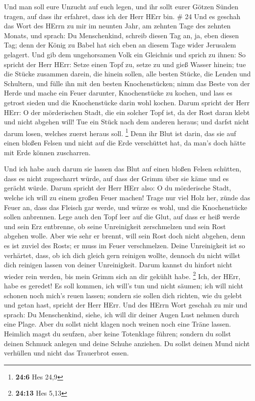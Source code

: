  Und man soll eure Unzucht auf euch legen, und ihr sollt
eurer Götzen Sünden tragen, auf dass ihr erfahret, dass ich der Herr
HErr bin. \# 24  Und es geschah das Wort des HErrn zu mir im
neunten Jahr, am zehnten Tage des zehnten Monats, und sprach:
 Du Menschenkind, schreib diesen Tag an, ja, eben diesen
Tag; denn der König zu Babel hat sich eben an diesem Tage wider
Jerusalem gelagert.  Und gib dem ungehorsamen Volk ein
Gleichnis und sprich zu ihnen: So spricht der Herr HErr: Setze einen
Topf zu, setze zu und gieß Wasser hinein;  tue die Stücke
zusammen darein, die hinein sollen, alle besten Stücke, die Lenden und
Schultern, und fülle ihn mit den besten Knochenstücken; 
nimm das Beste von der Herde und mache ein Feuer darunter, Knochenstücke
zu kochen, und lass es getrost sieden und die Knochenstücke darin wohl
kochen.  Darum spricht der Herr HErr: O der mörderischen
Stadt, die ein solcher Topf ist, da der Rost daran klebt und nicht
abgehen will! Tue ein Stück nach dem anderen heraus; und darfst nicht
darum losen, welches zuerst heraus soll. \footnote{\textbf{24:6} Hes
  24,9}  Denn ihr Blut ist darin, das sie auf einen bloßen
Felsen und nicht auf die Erde verschüttet hat, da man's doch hätte mit
Erde können zuscharren.

 Und ich habe auch darum sie lassen das Blut auf einen
bloßen Felsen schütten, dass es nicht zugescharrt würde, auf dass der
Grimm über sie käme und es gerächt würde.  Darum spricht der
Herr HErr also: O du mörderische Stadt, welche ich will zu einem großen
Feuer machen!  Trage nur viel Holz her, zünde das Feuer an,
dass das Fleisch gar werde, und würze es wohl, und die Knochenstücke
sollen anbrennen.  Lege auch den Topf leer auf die Glut,
auf dass er heiß werde und sein Erz entbrenne, ob seine Unreinigkeit
zerschmelzen und sein Rost abgehen wolle.  Aber wie sehr er
brennt, will sein Rost doch nicht abgehen, denn es ist zuviel des Rosts;
er muss im Feuer verschmelzen.  Deine Unreinigkeit ist so
verhärtet, dass, ob ich dich gleich gern reinigen wollte, dennoch du
nicht willst dich reinigen lassen von deiner Unreinigkeit. Darum kannst
du hinfort nicht wieder rein werden, bis mein Grimm sich an dir gekühlt
habe. \footnote{\textbf{24:13} Hes 5,13}  Ich, der HErr,
habe es geredet! Es soll kommen, ich will's tun und nicht säumen; ich
will nicht schonen noch mich's reuen lassen; sondern sie sollen dich
richten, wie du gelebt und getan hast, spricht der Herr HErr.
 Und des HErrn Wort geschah zu mir und sprach:
 Du Menschenkind, siehe, ich will dir deiner Augen Lust
nehmen durch eine Plage. Aber du sollst nicht klagen noch weinen noch
eine Träne lassen.  Heimlich magst du seufzen, aber keine
Totenklage führen; sondern du sollst deinen Schmuck anlegen und deine
Schuhe anziehen. Du sollst deinen Mund nicht verhüllen und nicht das
Trauerbrot essen.

